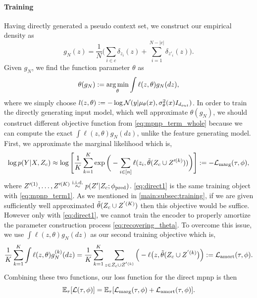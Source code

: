 \paragraph{Training}
Having directly generated a pseudo context set, we construct our empirical density as
\[
g_N(z) = \frac{1}{N}\bigg(\sum_{i\in c}\delta_{z_i}(z) + \sum_{i=1}^{N-|c|} \delta_{z'_i}(z)\bigg).
\]
Given $g_N$, we find the function parameter $\theta$ as
\[
\theta(g_N) := \operatorname*{arg\,min}_\theta \int \ell(z, \theta) g_N(dz),
\]
where we simply choose $l(z,\theta):=-\log {\mathcal{N}} (y|\mu_\theta(x),\sigma_\theta^2(x)I_{d_{out}})$.
In order to train the directly generating input model, which well approximate $\theta(g_N)$, we should construct different objective function from \cref{eq:mpnp_term_whole} because we can compute the exact $\int \ell(z, \theta) g_N(dz)$, unlike the feature generating model.
First, we approximate the marginal likelihood which is,
\[
\label{eq:direct1}
\log p(Y|X, Z_c) \approx \log \Bigg[ \frac{1}{K} \sum_{k=1}^K \exp\bigg(-\sum_{i\in [n]}\ell(z_i, \tilde\theta(Z_c\cup Z'^{(k)}))\bigg)
\Bigg] := -{\mathcal{L}}_\text{marg}(\tau,\phi),
\]
where $Z'^{(1)},\dots, Z'^{(K)}\overset{\mathrm{i.i.d.}}{\sim} p(Z'|Z_c;\phi_\text{pred})$.
\cref{eq:direct1} is the same training object with \cref{eq:mpnp_term1}.
As we mentioned in \cref{main:subsec:training}, if we are given sufficiently well approximated $\Tilde{\theta}(Z_c\cup Z^{'(K)})$ then this objective would be suffice. However only with \cref{eq:direct1}, we cannot train the encoder to properly amortize the parameter construction process \cref{eq:recovering_theta}. To overcome this issue, we use $\int \ell(z, \theta) g_N(dz)$ as our second training objective which is,
\[
\label{eq:direct2}
\frac{1}{K}\sum_{k=1}^K\int \ell(z,\theta)g_N^{(k)}(dz) = \frac{1}{K}\sum_{k=1}^K\sum_{z\in Z_c\cup Z^{'(k)}} \Big(-\ell \big(z, \tilde{\theta}(Z_c\cup Z^{'(k)}\big)\Big)
:= {\mathcal{L}}_\text{amort}(\tau,\phi).
\]
Combining these two functions, our loss function for the direct \gls{mpnp} is then
\[
\mathbb{E}_{\tau}[{\mathcal{L}}(\tau,\phi)] = \mathbb{E}_\tau[{\mathcal{L}}_\text{marg}(\tau,\phi) + {\mathcal{L}}_\text{amort}(\tau,\phi)].
\]

